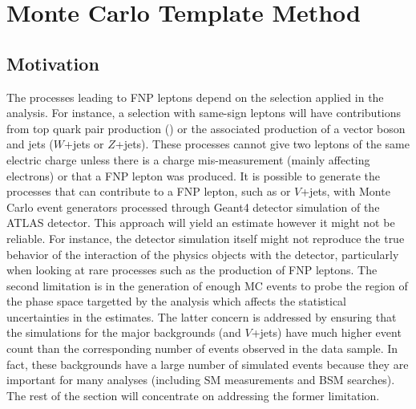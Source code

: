 \section{Monte Carlo Template Method}
\graphicspath{{figures/mct/}}

\subsection{Motivation}
The processes leading to FNP leptons depend on the selection applied in the analysis. For instance, a selection with same-sign leptons 
will have contributions from top quark pair production (\ttbar) or the associated production of a vector boson and jets 
($W$+jets or $Z$+jets).%
These processes cannot give two leptons of the same electric charge unless there is a charge mis-measurement (mainly affecting electrons) 
or that a FNP lepton was produced. It is possible to generate the processes that can contribute to a FNP lepton, such as \ttbar or 
$V$+jets, with Monte Carlo event generators processed through Geant4 detector simulation of the ATLAS detector.  
This approach will yield an estimate however it might not be reliable. For instance, the detector simulation itself might not 
reproduce the true behavior of the interaction of the physics objects with the detector, particularly when looking at rare processes 
such as the production of FNP leptons. The second limitation is in the generation of enough MC events to probe the region of the 
phase space targetted by the analysis which affects the statistical uncertainties in the estimates.
The latter concern is addressed by ensuring that the simulations for the major backgrounds (\ttbar and $V$+jets) have much 
higher event count than the corresponding number of events observed in the data sample.
In fact, these backgrounds have a large number of simulated events because they are important for many analyses 
(including SM measurements and BSM searches).
The rest of the section will concentrate on addressing the former limitation. 



